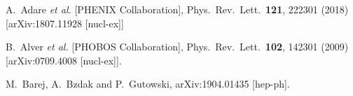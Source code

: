 \documentclass[a4paper,12pt]{article}
\begin{document}
\begin{thebibliography}{9}
  A.~Adare {\it et al.} [PHENIX Collaboration],
  Phys.\ Rev.\ Lett.\ {\bf 121}, 222301 (2018) [arXiv:1807.11928 [nucl-ex]]

  B.~Alver {\it et al.} [PHOBOS Collaboration],
  Phys.\ Rev.\ Lett.\  {\bf 102}, 142301 (2009)
  [arXiv:0709.4008 [nucl-ex]].

  M.~Barej, A.~Bzdak and P.~Gutowski,
  arXiv:1904.01435 [hep-ph].




\end{thebibliography}
\end{document}
